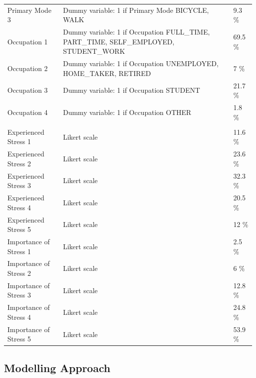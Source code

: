 \documentclass[
11pt, %
oneside, %
english, %
singlespacing, %
]{macthesis} %
\begin{document}
\begin{table}
{\begin{tabular}[t]{lll}
\hspace{1em}Primary Mode 3 & Dummy variable: 1 if Primary Mode BICYCLE, WALK & 9.3 \%\\
\hspace{1em}Occupation 1 & Dummy variable: 1 if Occupation FULL\_TIME, PART\_TIME, SELF\_EMPLOYED, STUDENT\_WORK & 69.5 \%\\
\hspace{1em}Occupation 2 & Dummy variable: 1 if Occupation UNEMPLOYED, HOME\_TAKER, RETIRED & 7 \%\\
\hspace{1em}Occupation 3 & Dummy variable: 1 if Occupation STUDENT & 21.7 \%\\
\hspace{1em}Occupation 4 & Dummy variable: 1 if Occupation OTHER & 1.8 \%\\
\addlinespace[0.3em]
\multicolumn{3}{l}{\textbf{Stress Characteristics}}\\
\hspace{1em}Experienced Stress 1 & Likert scale & 11.6 \%\\
\hspace{1em}Experienced Stress 2 & Likert scale & 23.6 \%\\
\hspace{1em}Experienced Stress 3 & Likert scale & 32.3 \%\\
\hspace{1em}Experienced Stress 4 & Likert scale & 20.5 \%\\
\hspace{1em}Experienced Stress 5 & Likert scale & 12 \%\\
\hspace{1em}Importance of Stress 1 & Likert scale & 2.5 \%\\
\hspace{1em}Importance of Stress 2 & Likert scale & 6 \%\\
\hspace{1em}Importance of Stress 3 & Likert scale & 12.8 \%\\
\hspace{1em}Importance of Stress 4 & Likert scale & 24.8 \%\\
\hspace{1em}Importance of Stress 5 & Likert scale & 53.9 \%\\
\bottomrule
\end{tabular}}
\end{table}
\hypertarget{modelling-approach}{%
\subsection{Modelling Approach}\label{modelling-approach}}
\end{document}
